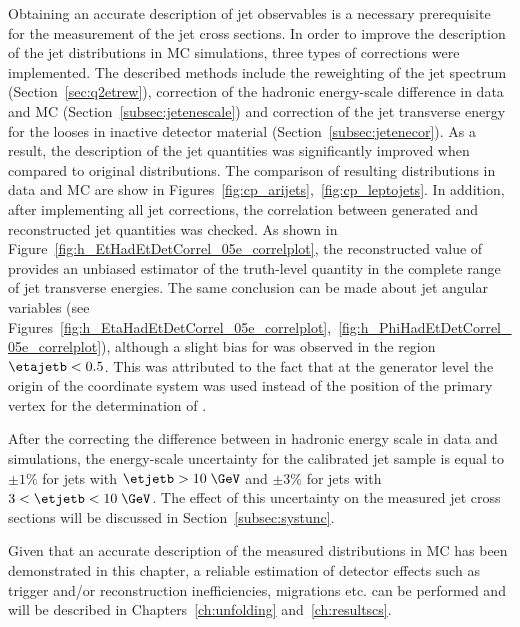 %
Obtaining an accurate description of jet observables is a necessary prerequisite for the measurement of the jet cross sections. In order to improve the description of the jet distributions in MC simulations, three types of corrections were implemented. The described methods include the reweighting of the jet spectrum (Section~\ref{sec:q2etrew}), correction of the hadronic energy-scale difference in data and MC (Section~\ref{subsec:jetenescale}) and correction of the jet transverse energy for the looses in inactive detector material (Section~\ref{subsec:jetenecor}). As a result, the description of the jet quantities was significantly improved when compared to original distributions. The comparison of resulting distributions in data and MC are show in Figures~\ref{fig:cp_arijets},~\ref{fig:cp_leptojets}. In addition, after implementing all jet corrections, the correlation between generated and reconstructed jet quantities was checked. As shown in Figure~\ref{fig:h_EtHadEtDetCorrel_05e_correlplot}, the reconstructed value of \etjetb provides an unbiased estimator of the truth-level quantity in the complete range of jet transverse energies. The same conclusion can be made about jet angular variables (see Figures~\ref{fig:h_EtaHadEtDetCorrel_05e_correlplot},~\ref{fig:h_PhiHadEtDetCorrel_05e_correlplot}), although a slight bias for \etajetb was observed in the region $\etajetb < 0.5$. This was attributed to the fact that at the generator level the origin of the \zeus coordinate system was used instead of the position of the primary vertex for the determination of \etajetb.

After the correcting the difference between in hadronic energy scale in data and simulations, the energy-scale uncertainty for the calibrated jet sample is equal to $\pm 1\%$ for jets with $\etjetb > 10\;\GeV$  and $\pm 3\%$ for jets with $3 < \etjetb < 10\;\GeV$. The effect of this uncertainty on the measured jet cross sections will be discussed in Section~\ref{subsec:systunc}.

Given that an accurate description of the measured distributions in MC has been demonstrated in this chapter, a reliable estimation of detector effects such as trigger and/or reconstruction inefficiencies, migrations etc. can be performed and will be described in Chapters~\ref{ch:unfolding} and~\ref{ch:resultscs}.